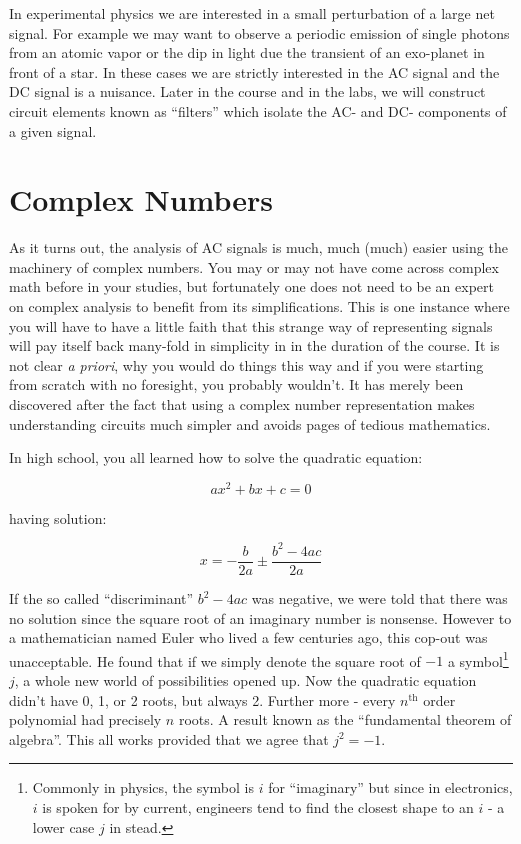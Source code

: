 \documentclass{tufte-book}
\begin{document}
In experimental physics we are interested in a small perturbation of a large net signal. For example we may want to observe a periodic emission of single photons from an atomic vapor or the dip in light due the transient of an exo-planet in front of a star. In these cases we are strictly interested in the AC signal and the DC signal is a nuisance. Later in the course and in the labs, we will construct circuit elements known as ``filters'' which isolate the AC- and DC- components of a given signal.

\section{Complex Numbers}

As it turns out, the analysis of AC signals is much, much (much) easier using the machinery of complex numbers. You may or may not have come across complex math before in your studies, but fortunately one does not need to be an expert on complex analysis to benefit from its simplifications. This is one instance where you will have to have a little faith that this strange way of representing signals will pay itself back many-fold in simplicity in in the duration of the course. It is not clear \textit{a priori}, why you would do things this way and if you were starting from scratch with no foresight, you probably wouldn't. It has merely been discovered after the fact that using a complex number representation makes understanding circuits much simpler and avoids pages of tedious mathematics. 

In high school, you all learned how to solve the quadratic equation:

$$
ax^2 + bx + c = 0
$$

\noindent having solution:

$$
x = -\frac{b}{2a} \pm \frac{b^2-4ac}{2a}
$$

If the so called ``discriminant'' $b^2 - 4ac$ was negative, we were told that there was no solution since the square root of an imaginary number is nonsense. However to a mathematician named Euler who lived a few centuries ago, this cop-out was unacceptable. He found that if we simply denote the square root of $-1$ a symbol\footnote{Commonly in physics, the symbol is $i$ for ``imaginary'' but since in electronics, $i$ is spoken for by current, engineers tend to find the closest shape to an $i$ - a lower case $j$ in stead.} $j$, a whole new world of possibilities opened up. Now the quadratic equation didn't have 0, 1, or 2 roots, but always 2. Further more - every $n^{\text{th}}$ order polynomial had precisely $n$ roots. A result known as the ``fundamental theorem of algebra''. This all works provided that we agree that $j^2 = -1$. 
\end{document}
